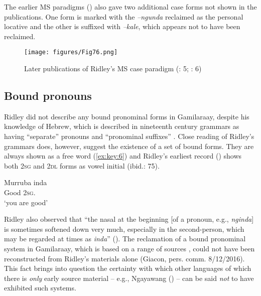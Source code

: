 The earlier MS paradigms (\citeyear{ridley_kamilaroi_1855}) also gave two additional case forms not shown in the publications. One form is marked with the \textit{–ngunda} reclaimed as the personal locative \citep[36--37]{Giacon2014} and the other is suffixed with \textit{–kale}, which appears not to have been reclaimed.


\begin{figure}
\texttt{[image: figures/Fig76.png]}
\caption{Later publications of Ridley’s MS case paradigm (\citeyear{ridley_kamilaroi_1866}: 5; \citeyear{ridley_kamilaroi_1875}: 6)}
\label{fig:4:76}
\end{figure}


\subsection{Bound pronouns}
\label{sec:key:4.5.5}

Ridley did not describe any bound pronominal forms in Gamilaraay, despite his knowledge of Hebrew, which is described in nineteenth century grammars as having “separate” pronouns and “pronominal suffixes” \citep[105--109]{gesenius_gesenius_1910}. Close reading of Ridley’s grammars does, however, suggest the existence of a set of bound forms. They are always shown as a free word (\ref{ex:key:6}) and Ridley’s earliest record (\citeyear{ridley_kamilaroi_1855-1}) shows both 2\textsc{sg} and 2\textsc{dl} forms as vowel initial (ibid.: 75).

\ea\label{ex:key:6}
\gll Murruba inda \\
Good 2\textsc{sg}. \\
\glt `you are good' \\
\citep[39]{ridley_kamilaroi_1875}
\z 	

\hspace*{-2.3pt}Ridley also observed that “the nasal at the beginning [of a pronoun, e.g., \textit{nginda}] is sometimes softened down very much, especially in the second-person, which may be regarded at times as \textit{inda}” (\citeyear[6]{ridley_kamilaroi_1875}). The reclamation of a bound pronominal system in Gamilaraay, which is based on a range of sources \citep[129--130]{Giacon2014}, could not have been reconstructed from Ridley’s materials alone (Giacon, pers. comm. 8/12/2016). This fact brings into question the certainty with which other languages of which there is \textit{only} early source material -- e.g., Ngayawang () -- can be said \textit{not} to have exhibited such systems.

